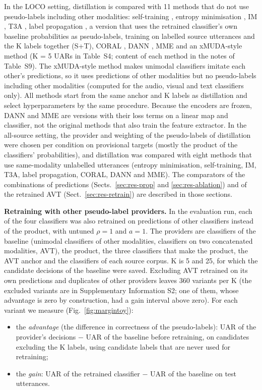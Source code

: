 In the LOCO setting, distillation is compared with 11 methods that do not use pseudo-labels including other modalities: self-training \cite{lee2013pseudolabel}, entropy minimisation \cite{grandvalet2004}, IM \cite{liang2020,boudiaf2020}, T3A \cite{iwasawa2021}, label propagation \cite{zhou2004,iscen2019}, a version that uses the retrained classifier's own baseline probabilities as pseudo-labels, training on labelled source utterances and the K labels together (S+T), CORAL \cite{sun2016coral}, DANN \cite{ganin2016dann}, MME \cite{saito2019mme} and an xMUDA-style method \cite{jaritz2020xmuda} (K = 5 UARs in Table~S4; content of each method in the notes of Table~S9). The xMUDA-style method makes unimodal classifiers imitate each other's predictions, so it uses predictions of other modalities but no pseudo-labels including other modalities (computed for the audio, visual and text classifiers only). All methods start from the same anchor and K labels as distillation and select hyperparameters by the same procedure. Because the encoders are frozen, DANN and MME are versions with their loss terms on a linear map and classifier, not the original methods that also train the feature extractor. In the all-source setting, the provider and weighting of the pseudo-labels of distillation were chosen per condition on provisional targets (mostly the product of the classifiers' probabilities), and distillation was compared with eight methods that use same-modality unlabelled utterances (entropy minimisation, self-training, IM, T3A, label propagation, CORAL, DANN and MME). The comparators of the combinations of predictions (Sects.~\ref{sec:res-prop} and \ref{sec:res-ablation}) and of the retrained AVT (Sect.~\ref{sec:res-retrain}) are described in those sections.

\textbf{Retraining with other pseudo-label providers.} In the evaluation run, each of the four classifiers was also retrained on predictions of other classifiers instead of the product, with untuned $\rho=1$ and $a=1$. The providers are classifiers of the baseline (unimodal classifiers of other modalities, classifiers on two concatenated modalities, AVT), the product, the three classifiers that make the product, the AVT anchor and the classifiers of each source corpus. K is 5 and 25, for which the candidate decisions of the baseline were saved. Excluding AVT retrained on its own predictions and duplicates of other providers leaves 360 variants per K (the excluded variants are in Supplementary Information S2; one of them, whose advantage is zero by construction, had a gain interval above zero). For each variant we measure (Fig.~\ref{fig:margintoy}):
\begin{itemize}
\item the \emph{advantage} (the difference in correctness of the pseudo-labels): UAR of the provider's decisions $-$ UAR of the baseline before retraining, on candidates excluding the K labels, using candidate labels that are never used for retraining;
\item the \emph{gain}: UAR of the retrained classifier $-$ UAR of the baseline on test utterances.
\end{itemize}


